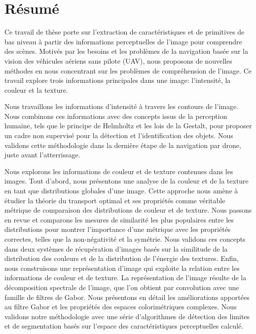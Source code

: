\chapter*{Résumé}

\vspace*{-12ex}

\noindent Ce travail de thèse porte sur l'extraction de caractéristiques et de primitives de bas niveau à partir des informations perceptuelles de l'image pour comprendre des scènes. Motivés par les besoins et les problèmes de la navigation basée sur la vision des véhicules aériens sans pilote (UAV), nous proposons de nouvelles méthodes en nous concentrant sur les problèmes de compréhension de l'image. Ce travail explore trois informations principales dans une image: l'intensité, la couleur et la texture.
\newline 

\noindent Nous travaillons les informations d'intensité à travers les contours de l'image. Nous combinons ces informations avec des concepts issus de la perception humaine, tels que le principe de Helmholtz et les lois de la Gestalt, pour proposer un cadre non supervisé pour la détection et l'identification des objets. Nous validons cette méthodologie dans la dernière étape de la navigation par drone, juste avant l'atterrissage.
\newline 

\noindent Nous explorons les informations de couleur et de texture contenues dans les images. Tout d'abord, nous présentons une analyse de la couleur et de la texture en tant que distributions globales d'une image. Cette approche nous amène à étudier la théorie du transport optimal et ses propriétés comme véritable métrique de comparaison des distributions de couleur et de texture. Nous passons en revue et comparons les mesures de similarité les plus populaires entre les distributions pour montrer l'importance d'une métrique avec les propriétés correctes, telles que la non-négativité et la symétrie. Nous validons ces concepts dans deux systèmes de récupération d'images basés sur la similitude de la distribution des couleurs et de la distribution de l'énergie des textures.
\noindent Enfin, nous construisons une représentation d'image qui exploite la relation entre les informations de couleur et de texture. La représentation de l'image résulte de la décomposition spectrale de l'image, que l'on obtient par convolution avec une famille de filtres de Gabor. Nous présentons en détail les améliorations apportées au filtre Gabor et les propriétés des espaces colorimétriques complexes. Nous validons notre méthodologie avec une série d'algorithmes de détection des limites et de segmentation basés sur l'espace des caractéristiques perceptuelles calculé.


